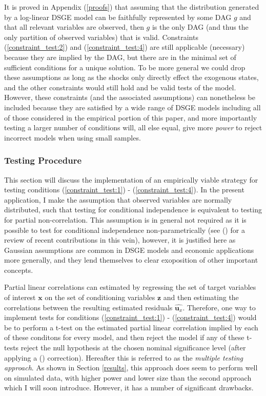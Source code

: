 \documentclass{article}
\begin{document}
It is proved in Appendix (\ref{proofs}) that assuming that the distribution generated by a log-linear DSGE model can be faithfully represented by some DAG $g$ and that all relevant variables are observed, then $g$ is the only DAG (and thus the only partition of observed variables) that is valid. Constraints (\ref{constraint_test:2}) and (\ref{constraint_test:4}) are still applicable (necessary) because they are implied by the DAG, but there are in the minimal set of sufficient conditions for a unique solution. To be more general we could drop these assumptions as long as the shocks only directly effect the exogenous states, and the other constraints would still hold and be valid tests of the model. However, these constraints (and the associated assumptions) can nonetheless be included because they are satisfied by a wide range of DSGE models including all of those considered in the empirical portion of this paper, and more importantly testing a larger number of conditions will, all else equal, give more \textit{power} to reject incorrect models when using small samples.

\subsubsection{Testing Procedure} \label{testing}

This section will discuss the implementation of an empirically viable strategy for testing conditions (\ref{constraint_test:1}) - (\ref{constraint_test:4}). In the present application, I make the assumption that observed variables are normally distributed, such that testing for conditional independence is equivalent to testing for partial non-correlation. This assumption is in general not required as it is possible to test for conditional independence non-parametrically (see \citeauthor{strobl2019approximate} (\citeyear{strobl2019approximate}) for a review of recent contributions in this vein), however, it is justified here as Gaussian assumptions are common in DSGE models and economic applications more generally, and they lend themselves to clear exoposition of other important concepts. 

Partial linear correlations can estimated by regressing the set of target variables of interest $\mathbf{x}$ on the set of conditioning variables $\mathbf{z}$ and then estimating the correlations between the resulting estimated residuals $\hat{\mathbf{u}_x}$. Therefore, one way to implement tests for conditions (\ref{constraint_test:1}) - (\ref{constraint_test:4}) would be to perform a t-test on the estimated partial linear correlation implied by each of these conditons for every model, and then reject the model if any of these t-tests reject the null hypothesis at the chosen nominal significance level (after applying a \citeauthor{bonferroni1936teoria} (\citeyear{bonferroni1936teoria}) correction). Hereafter this is referred to as the \textit{multiple testing approach}. As shown in Section \ref{results}, this approach does seem to perform well on simulated data, with higher power and lower size than the second approach which I will soon introduce. However, it has a number of significant drawbacks. 
\end{document}
